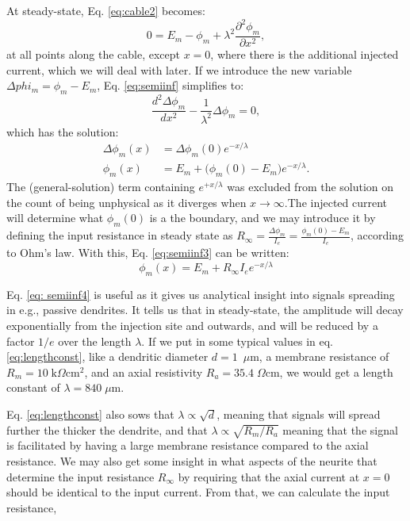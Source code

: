 \begin{itemize}
\begin{itemize}
At steady-state, Eq. \ref{eq:cable2} becomes:
\begin{equation}
0 = E_m-\phi_m +  \lambda^2 \frac{\partial^2 \phi_m}{\partial x^2}, 
\label{eq:semiinf}
\end{equation}
at all points along the cable, except $x=0$, where there is the additional injected current, which we will deal with later. If we introduce the new variable $\Delta{phi_m}=\phi_m-E_m$, Eq. \ref{eq:semiinf} simplifies to:
\begin{equation}
\frac{d^2 \Delta{\phi_m}}{d x^2} -  \frac{1}{\lambda^2} \Delta{\phi_m}=0, 
\label{eq:semiinf2}
\end{equation}
which has the solution:
\begin{align}
\Delta{\phi_m}(x) &= \Delta{\phi_m}(0) e^{-x/\lambda} \\
\phi_m(x) &= E_m + \big( \phi_m(0)-E_m \big) e^{-x/\lambda}.
\label{eq:semiinf3}
\end{align}
The (general-solution) term containing $e^{+x/\lambda}$ was excluded from the solution on the count of being unphysical as it diverges when $x \rightarrow \infty$.The injected current will determine what $\phi_m(0)$ is a the boundary, and we may introduce it by defining the input resistance in steady state as $R_{\infty} =  \frac{\Delta \phi_m}{I_e} =  \frac{\phi_m(0)-E_m}{I_e}$, according to Ohm's law. With this, Eq. \ref{eq:semiinf3} can be written:
\begin{equation}
\phi_m(x) = E_m + R_{\infty} I_e e^{-x/\lambda}
\label{eq:semiinf4}
\end{equation}

Eq. \ref{eq: semiinf4} is useful as it gives us analytical insight into signals spreading in e.g., passive dendrites. It tells us that in steady-state, the amplitude will decay exponentially from the injection site and outwards, and will be reduced by a factor $1/e$ over the length $\lambda$. If we put in some typical values in eq. \ref{eq:lengthconst}, like a dendritic diameter $d=1$~$\mu$m, a membrane resistance of $R_m=10\;\text{k}\Omega\text{cm}^2$, and an axial resistivity $R_a=35.4\;\Omega\text{cm}$, we would get a length constant of $\lambda = 840\; \mu$m. 

Eq. \ref{eq:lengthconst} also sows that $\lambda \propto \sqrt{d}$, meaning that signals will spread further the thicker the dendrite, and that $\lambda \propto \sqrt{R_m/R_a}$ meaning that the signal is facilitated by having a large membrane resistance compared to the axial resistance. We may also get some insight in what aspects of the neurite that determine the input resistance $R_{\infty}$ by requiring that the axial current at $x=0$ should be identical to the input current. From that, we can calculate the input resistance, 


\end{itemize}
\end{itemize}
